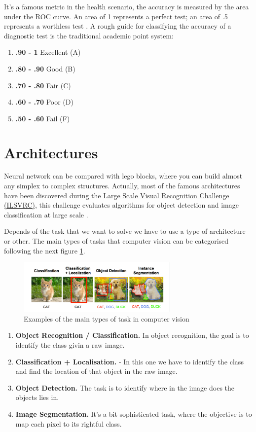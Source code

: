 It's a famous metric in the health scenario, the accuracy is measured by the area under the ROC curve. An area of 1 represents a perfect test; an area of .5 represents a worthless test \cite{area-roc-curve}. A rough guide for classifying the accuracy of a diagnostic test is the traditional academic point system:

\begin{enumerate}
\item \textbf{.90 - 1} Excellent (A)
\item \textbf{.80 - .90} Good (B)
\item \textbf{.70 - .80} Fair (C)
\item \textbf{.60 - .70} Poor (D)
\item \textbf{.50 - .60} Fail (F)
\end{enumerate}


\section[Architectures]{Architectures}

Neural network can be compared with lego blocks, where you can build almost any simplex to complex structures. Actually, most of the famous architectures have been discovered during the 
\href{http://www.image-net.org/challenges/LSVRC/}{Large Scale Visual Recognition Challenge (ILSVRC)},  this challenge evaluates algorithms for object detection and image classification at large scale \cite{architectures}.

Depends of the task that we want to solve we have to use a type of architecture or other. The main types of tasks that computer vision can be categorised following the next figure \ref{fig:maintasks}.

\begin{figure}[H]
\centering
\includegraphics[width=0.7\textwidth]{./figures/Tasks-Architectures}
\caption{Examples of the main types of task in computer vision \cite{architectures}}
\label{fig:maintasks}
\end{figure}

\begin{enumerate}
\item \textbf{Object Recognition / Classification.} In object recognition, the goal is to identify the class givin a raw image.
\item \textbf{Classification + Localisation.} - In this one we have to identify the class and find the location of that object in the raw image.
\item \textbf{Object Detection.} The task is to identify where in the image does the objects lies in. 
\item \textbf{Image Segmentation.} It's a bit sophisticated task, where the objective is to map each pixel to its rightful class.
\end{enumerate}

